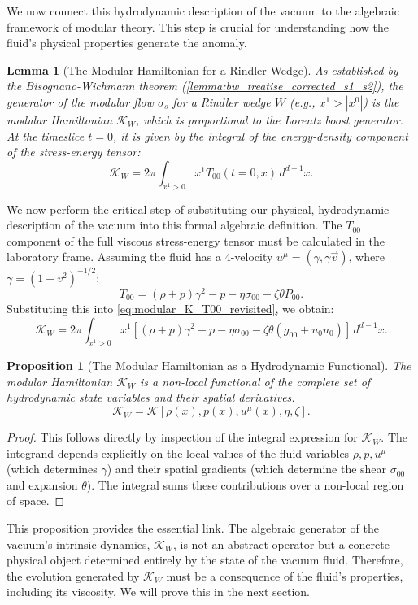 \documentclass[11pt, letterpaper]{report}
\theoremstyle{plain} %
\newtheorem{lemma}[theorem]{Lemma}
\newtheorem{proposition}[theorem]{Proposition}
\theoremstyle{definition} %
\theoremstyle{remark} %
\newcommand{\ModularK}{\mathcal{K}}
\begin{document}
We now connect this hydrodynamic description of the vacuum to the algebraic framework of modular theory. This step is crucial for understanding how the fluid's physical properties generate the anomaly.

\begin{lemma}[The Modular Hamiltonian for a Rindler Wedge]
\label{lemma:modular_hamiltonian_rindler}
As established by the Bisognano-Wichmann theorem (\cref{lemma:bw_treatise_corrected_s1_s2}), the generator of the modular flow $\sigma_s$ for a Rindler wedge $W$ (e.g., $x^1>|x^0|$) is the modular Hamiltonian $\ModularK_W$, which is proportional to the Lorentz boost generator. At the timeslice $t=0$, it is given by the integral of the energy-density component of the stress-energy tensor:
\begin{equation}
    \ModularK_W = 2\pi \int_{x^1>0} x^1 T_{00}(t=0, x) \, d^{d-1}x.
    \label{eq:modular_K_T00_revisited}
\end{equation}
\end{lemma}

We now perform the critical step of substituting our physical, hydrodynamic description of the vacuum into this formal algebraic definition. The $T_{00}$ component of the full viscous stress-energy tensor must be calculated in the laboratory frame. Assuming the fluid has a 4-velocity $u^\mu = (\gamma, \gamma\vec{v})$, where $\gamma = (1-v^2)^{-1/2}$:
\begin{equation}
    T_{00} = (\rho+p)\gamma^2 - p - \eta\sigma_{00} - \zeta\theta P_{00}.
\end{equation}
Substituting this into \cref{eq:modular_K_T00_revisited}, we obtain:
\begin{equation}
    \ModularK_W = 2\pi \int_{x^1>0} x^1 \left[ (\rho+p)\gamma^2 - p - \eta\sigma_{00} - \zeta\theta(g_{00}+u_0u_0) \right] \, d^{d-1}x.
\end{equation}
\begin{proposition}[The Modular Hamiltonian as a Hydrodynamic Functional]
\label{prop:K_is_hydro_functional}
The modular Hamiltonian $\ModularK_W$ is a non-local functional of the complete set of hydrodynamic state variables and their spatial derivatives.
\begin{equation}
    \ModularK_W = \mathcal{K}[\rho(x), p(x), u^\mu(x), \eta, \zeta].
\end{equation}
\end{proposition}
\begin{proof}
This follows directly by inspection of the integral expression for $\ModularK_W$. The integrand depends explicitly on the local values of the fluid variables $\rho, p, u^\mu$ (which determines $\gamma$) and their spatial gradients (which determine the shear $\sigma_{00}$ and expansion $\theta$). The integral sums these contributions over a non-local region of space.
\end{proof}
This proposition provides the essential link. The algebraic generator of the vacuum's intrinsic dynamics, $\ModularK_W$, is not an abstract operator but a concrete physical object determined entirely by the state of the vacuum fluid. Therefore, the evolution generated by $\ModularK_W$ must be a consequence of the fluid's properties, including its viscosity. We will prove this in the next section.
\end{document}
